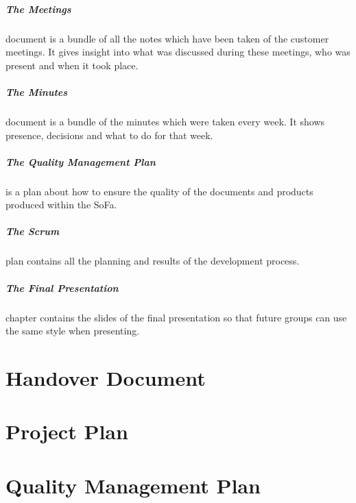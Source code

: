 \documentclass[12pt]{report}
\newcommand{\addPart}[1]
{
  \clearpage
  \setlength{\voffset}{0cm}
  \setlength{\hoffset}{0cm}

  

  \setmarginsrb{3 cm}{2.5 cm}{3 cm}{2.5 cm}{1 cm}{1.5 cm}{1 cm}{1.5 cm}
}
\begin{document}
  
  \paragraph*{The Meetings} document is a bundle of all the notes which have been taken of the customer meetings. It gives insight into what was discussed during these meetings, who was present and when it took place.
  
  \paragraph*{The Minutes} document is a bundle of the minutes which were taken every week. It shows presence, decisions and what to do for that week.
  
  \paragraph*{The Quality Management Plan} is a plan about how to ensure the quality of the documents and products produced within the SoFa.
  
  \paragraph*{The Scrum} plan contains all the planning and results of the development process.
      
  \paragraph*{The Final Presentation} chapter contains the slides of the final presentation so that future groups can use the same style when presenting.
  
  
  \clearpage
  
  \chapter{Handover Document}
  \addPart{parts/handoverdocument/handoverdocument.pdf}
  
  \chapter{Project Plan}
  \addPart{parts/ProjectPlan.pdf}
  
  \chapter{Quality Management Plan}
  \addPart{parts/qualitymanagementplan/qualitymanagementplan.pdf}
\end{document}
